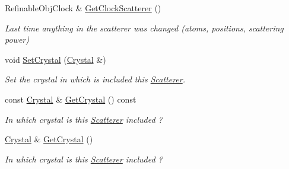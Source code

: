 \begin{DoxyCompactItemize}
\mbox{\label{class_obj_cryst_1_1_scatterer_af8ad08284c802eb8d025d6c2f5ed211c}} 
Refinable\+Obj\+Clock \& \mbox{\hyperlink{class_obj_cryst_1_1_scatterer_af8ad08284c802eb8d025d6c2f5ed211c}{Get\+Clock\+Scatterer}} ()
\begin{DoxyCompactList}\small\item\em Last time anything in the scatterer was changed (atoms, positions, scattering power) \end{DoxyCompactList}\item 
\mbox{\label{class_obj_cryst_1_1_scatterer_ace072c5113b5328a7145d33779582621}} 
void \mbox{\hyperlink{class_obj_cryst_1_1_scatterer_ace072c5113b5328a7145d33779582621}{Set\+Crystal}} (\mbox{\hyperlink{class_obj_cryst_1_1_crystal}{Crystal}} \&)
\begin{DoxyCompactList}\small\item\em Set the crystal in which is included this \mbox{\hyperlink{class_obj_cryst_1_1_scatterer}{Scatterer}}. \end{DoxyCompactList}\item 
\mbox{\label{class_obj_cryst_1_1_scatterer_a733922e9273220375cef87359773dc25}} 
const \mbox{\hyperlink{class_obj_cryst_1_1_crystal}{Crystal}} \& \mbox{\hyperlink{class_obj_cryst_1_1_scatterer_a733922e9273220375cef87359773dc25}{Get\+Crystal}} () const
\begin{DoxyCompactList}\small\item\em In which crystal is this \mbox{\hyperlink{class_obj_cryst_1_1_scatterer}{Scatterer}} included ? \end{DoxyCompactList}\item 
\mbox{\label{class_obj_cryst_1_1_scatterer_a7f6162168e96c40a041294b730c99618}} 
\mbox{\hyperlink{class_obj_cryst_1_1_crystal}{Crystal}} \& \mbox{\hyperlink{class_obj_cryst_1_1_scatterer_a7f6162168e96c40a041294b730c99618}{Get\+Crystal}} ()
\begin{DoxyCompactList}\small\item\em In which crystal is this \mbox{\hyperlink{class_obj_cryst_1_1_scatterer}{Scatterer}} included ? \end{DoxyCompactList}\end{DoxyCompactItemize}
